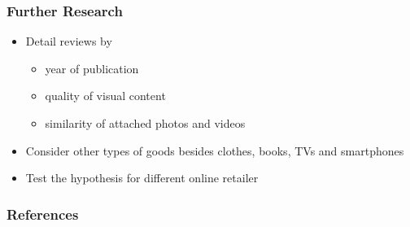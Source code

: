 \documentclass[xcolor=dvipsnames,envcountsect]{beamer}
\begin{document}
\begin{frame}
	\frametitle{Further Research}
	\justifying
    
    \begin{itemize}
        \item Detail reviews by
        \begin{itemize}
            \item year of publication
            \item quality of visual content
            \item similarity of attached photos and videos
        \end{itemize}
        \item Consider other types of goods besides clothes, books, TVs and smartphones
        \item Test the hypothesis for different online retailer
    \end{itemize}
\end{frame}
	\begin{frame}%
	\tiny
		\justifying
		\frametitle{References}
         
        
	\end{frame}
\end{document}
